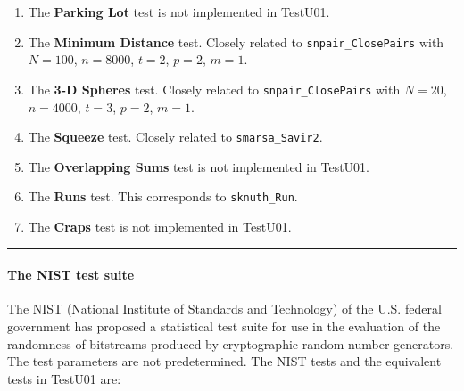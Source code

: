 \begin{enumerate}
\item The {\bf Parking Lot} test is not implemented in TestU01.

\item The {\bf Minimum Distance} test. Closely related
  to {\tt snpair\_ClosePairs}  with
 $N=100$, $n=8000$, $t=2$, $p=2$, $m=1$.

\item The {\bf 3-D Spheres} test. Closely related
  to {\tt snpair\_ClosePairs}  with
 $N=20$, $n=4000$, $t=3$, $p=2$, $m=1$.

\item The {\bf Squeeze} test.  Closely related
  to {\tt smarsa\_Savir2}.

\item The {\bf Overlapping Sums} test  is not implemented in TestU01.

\item The {\bf Runs} test.  This corresponds to  {\tt sknuth\_Run}.

\item The {\bf Craps} test  is not implemented in TestU01.

\end{enumerate}


\bigskip
\hrule

\paragraph{The NIST test suite}

The NIST (National Institute of Standards and Technology) of the U.S.
federal government has proposed a statistical test suite \cite{rRUK01a}
for use in the evaluation of the randomness of bitstreams
produced by cryptographic random number generators.
%
The test parameters are not predetermined.
The NIST tests and the equivalent tests in TestU01 are:

